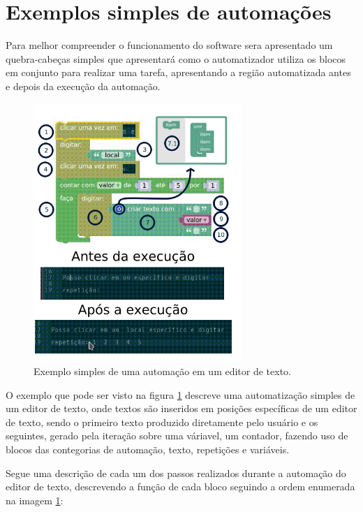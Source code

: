 \documentclass[tg]{mdtufsm}
\begin{document}
            \section {Exemplos simples de automações}

                Para melhor compreender o funcionamento do software sera apresentado um quebra-cabeças simples que apresentará como o automatizador utiliza os blocos em conjunto para realizar uma tarefa, apresentando a região automatizada antes e depois da execução da automação.

                \begin{figure}[!htb]
                    {\centering
                    \includegraphics[width=0.7\textwidth]{imagens/simpleBlockly.png}
                    \caption{Exemplo simples de uma automação em um editor de texto.}
                    \label{fig:simpleBlockly}}
                \end{figure}

                O exemplo que pode ser visto na figura \ref{fig:simpleBlockly} descreve uma automatização simples de um editor de texto, onde textos são inseridos em posições específicas de um editor de texto, sendo o primeiro texto produzido diretamente pelo usuário e os seguintes, gerado pela iteração sobre uma váriavel, um contador, fazendo uso de blocos das contegorias de automação, texto, repetições e variáveis.

                Segue uma descrição de cada um dos passos realizados durante a automação do editor de texto, descrevendo a função de cada bloco seguindo a ordem enumerada na imagem \ref{fig:simpleBlockly}:
\end{document}
